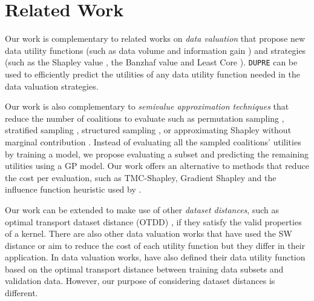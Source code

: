\section{Related Work}
Our work is complementary to related works on \emph{data valuation} that propose new data utility functions (such as data volume \cite{NEURIPS2021_59a3adea} and information gain \cite{sim2020cml}) and strategies (such as the Shapley value \cite{ghorbani2019data, Kwon2021betashapley, yan2021core}, the Banzhaf value \cite{wang2023data} and Least Core \cite{yan2021core}). \texttt{DUPRE} can be used to efficiently predict the utilities of any data utility function needed in the data valuation strategies.

Our work is also complementary to \emph{semivalue approximation techniques} that reduce the number of coalitions to evaluate such as permutation sampling \cite{castro2009polynomial}, stratified sampling \cite{Maleki.2013}, structured sampling \citep{vanCampen.2018}, or approximating Shapley without marginal contribution \cite{kolpaczki2024without}. Instead of evaluating all the sampled coalitions' utilities by training a model, we propose evaluating a subset and predicting the remaining utilities using a GP model. Our work offers an alternative to methods that reduce the cost per evaluation, such as TMC-Shapley, Gradient Shapley \cite{ghorbani2019data} and the influence function heuristic used by \citet{jia2019towards}.

Our work can be extended to make use of other \emph{dataset distances}, such as optimal transport dataset distance (OTDD) \cite{alvarez2020otdd}, if they satisfy the valid properties of a kernel. There are also other data valuation works that have used the SW distance or aim to reduce the cost of each utility function but they differ in their application. In data valuation works, \citet{just2023lava,kessler2024sava} have also defined their data utility function based on the optimal transport distance between training data subsets and validation data. However, our purpose of considering dataset distances is different.